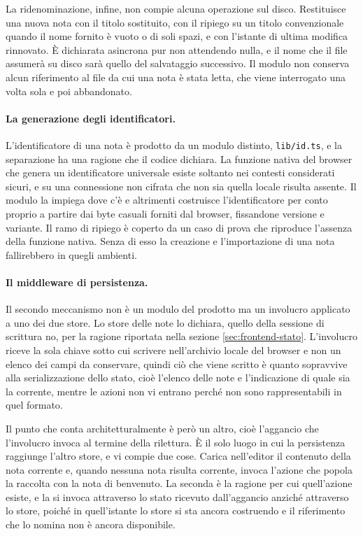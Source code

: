 \documentclass[a4paper, 10pt]{article}
\begin{document}
La ridenominazione, infine, non compie alcuna operazione sul disco. Restituisce una nuova nota con il titolo sostituito, con il ripiego su un titolo convenzionale quando il nome fornito è vuoto o di soli spazi, e con l'istante di ultima modifica rinnovato. È dichiarata asincrona pur non attendendo nulla, e il nome che il file assumerà su disco sarà quello del salvataggio successivo. Il modulo non conserva alcun riferimento al file da cui una nota è stata letta, che viene interrogato una volta sola e poi abbandonato.

\paragraph{La generazione degli identificatori.}
L'identificatore di una nota è prodotto da un modulo distinto, \texttt{lib/id.ts}, e la separazione ha una ragione che il codice dichiara. La funzione nativa del browser che genera un identificatore universale esiste soltanto nei contesti considerati sicuri, e su una connessione non cifrata che non sia quella locale risulta assente. Il modulo la impiega dove c'è e altrimenti costruisce l'identificatore per conto proprio a partire dai byte casuali forniti dal browser, fissandone versione e variante. Il ramo di ripiego è coperto da un caso di prova che riproduce l'assenza della funzione nativa. Senza di esso la creazione e l'importazione di una nota fallirebbero in quegli ambienti.

\paragraph{Il middleware di persistenza.}
Il secondo meccanismo non è un modulo del prodotto ma un involucro applicato a uno dei due store. Lo store delle note lo dichiara, quello della sessione di scrittura no, per la ragione riportata nella sezione \ref{sec:frontend-stato}. L'involucro riceve la sola chiave sotto cui scrivere nell'archivio locale del browser e non un elenco dei campi da conservare, quindi ciò che viene scritto è quanto sopravvive alla serializzazione dello stato, cioè l'elenco delle note e l'indicazione di quale sia la corrente, mentre le azioni non vi entrano perché non sono rappresentabili in quel formato.

Il punto che conta architetturalmente è però un altro, cioè l'aggancio che l'involucro invoca al termine della rilettura. È il solo luogo in cui la persistenza raggiunge l'altro store, e vi compie due cose. Carica nell'editor il contenuto della nota corrente e, quando nessuna nota risulta corrente, invoca l'azione che popola la raccolta con la nota di benvenuto. La seconda è la ragione per cui quell'azione esiste, e la si invoca attraverso lo stato ricevuto dall'aggancio anziché attraverso lo store, poiché in quell'istante lo store si sta ancora costruendo e il riferimento che lo nomina non è ancora disponibile.
\end{document}
